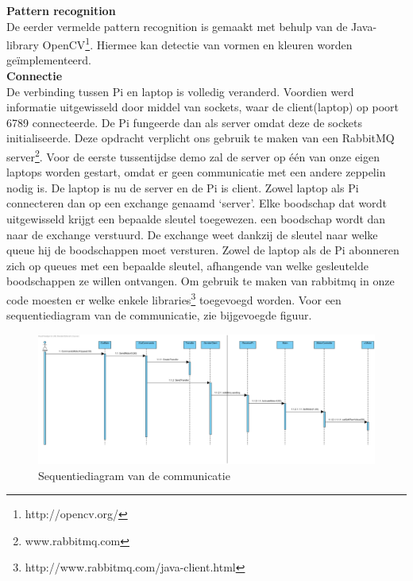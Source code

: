 \documentclass[tt]{penoverslag}
\begin{document}
\textbf{Pattern recognition}\\
De eerder vermelde pattern recognition is gemaakt met behulp van de Java-library OpenCV\footnote{http://opencv.org/}. Hiermee kan detectie van vormen en kleuren worden ge\"{i}mplementeerd. \\

\textbf{Connectie}\\
De verbinding tussen Pi en laptop is volledig veranderd. Voordien werd informatie uitgewisseld door middel van sockets, waar de client(laptop) op poort 6789 connecteerde. De Pi fungeerde dan als server omdat deze de sockets initialiseerde. Deze opdracht verplicht ons gebruik te maken van een RabbitMQ server\footnote{www.rabbitmq.com}. Voor de eerste tussentijdse demo zal de server op één van onze eigen laptops worden gestart, omdat er geen communicatie met een andere zeppelin nodig is. De laptop is nu de server en de Pi is client. Zowel laptop als Pi connecteren dan op een exchange genaamd ‘server’. Elke boodschap dat wordt uitgewisseld krijgt een bepaalde sleutel toegewezen. een boodschap wordt dan naar de exchange verstuurd. De exchange weet dankzij de sleutel naar welke queue hij de boodschappen moet versturen.  Zowel de laptop als de Pi abonneren zich op queues met een bepaalde sleutel, afhangende van welke gesleutelde boodschappen ze willen ontvangen. Om gebruik te maken van rabbitmq in onze code moesten er welke enkele libraries\footnote{http://www.rabbitmq.com/java-client.html} toegevoegd worden. Voor een sequentiediagram van de communicatie, zie bijgevoegde figuur.
\\

\begin{figure}[H]
\begin{center}
\includegraphics[width=1\textwidth]{PiToClientCommunication.png}
\end{center}
\caption{Sequentiediagram van de communicatie}
\label{Sequence}
\end{figure}
\end{document}
